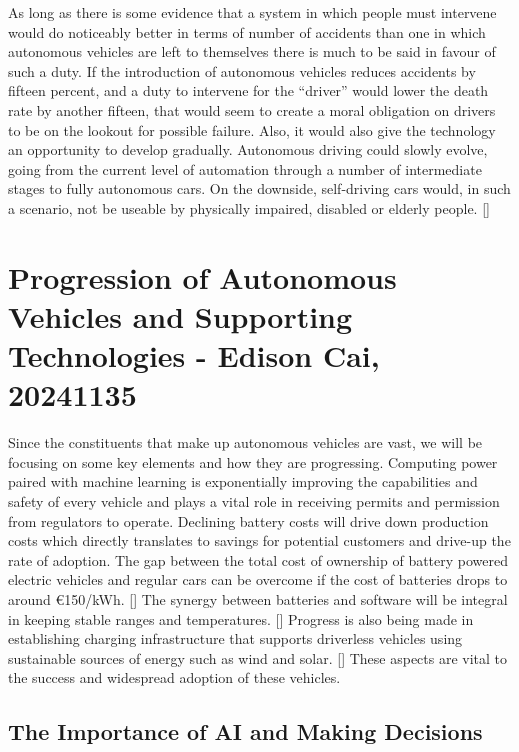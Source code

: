 \documentclass{article}
\begin{document}
As long as there is some evidence that a system in which people must intervene would do noticeably better in terms of number of accidents than one in which autonomous vehicles are left to themselves there is much to be said in favour of such a duty. If the introduction of autonomous vehicles reduces accidents by fifteen percent, and a duty to intervene for the “driver” would lower the death rate by another fifteen, that would seem to create a moral obligation on drivers to be on the lookout for possible failure. Also, it would also give the technology an opportunity to develop gradually. Autonomous driving could slowly evolve, going from the current level of automation through a number of intermediate stages to fully autonomous cars. On the downside, self-driving cars would, in such a scenario, not be useable by physically impaired, disabled or elderly people. [\textcite{hevelke2015responsibility}]


\section{Progression of Autonomous Vehicles and Supporting Technologies - Edison Cai, 20241135}

Since the constituents that make up autonomous vehicles are vast, we will be focusing on some key elements and how they are progressing. Computing power paired with machine learning is exponentially improving the capabilities and safety of every vehicle and plays a vital role in receiving permits and permission from regulators to operate. Declining battery costs will drive down production costs which directly translates to savings for potential customers and drive-up the rate of adoption. The gap between the total cost of ownership of battery powered electric vehicles and regular cars can be overcome if the cost of batteries drops to around
€150/kWh. [\textcite{van2011energy}] The synergy between batteries and software will be integral in keeping stable ranges and temperatures. [\textcite{ali2019towards}] Progress is also being made in establishing charging infrastructure that supports driverless vehicles using sustainable sources of energy such as wind and solar. [\textcite{nunes2015day}] These aspects are vital to the success and widespread adoption of these vehicles.  

\subsection{The Importance of AI and Making Decisions}
\end{document}
